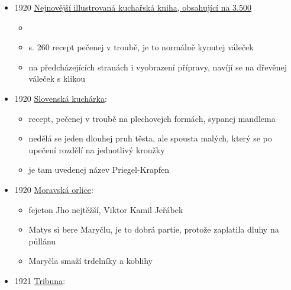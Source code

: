 \begin{itemize}
  \begin{itemize}
  \tightlist
  \item
    roč. 36, č. 40, s. 4
  \item
    není online, 
  \item
    přijela a svůj kraj dobře zná. Posléze zadržáni byli na chvilku ve
    slovácké šenkovně, kdež jim podány slovácké trdláče a
  \end{itemize}
\item
  1920
  \href{https://ndk.cz/uuid/uuid:d08ced10-7b32-11eb-9f97-005056827e51}{Nejnovější
  illustrovaná kuchařská kniha, obsahující na 3.500 }

  \begin{itemize}
  \tightlist
  \item
  \item
    s. 260 recept pečenej v troubě, je to normálně kynutej váleček
  \item
    na předcházejících stranách i vyobrazení přípravy, navíjí se na
    dřevěnej váleček s klikou
  \end{itemize}
\item
  1920
  \href{https://dikda.snk.sk/uuid/uuid:a65dbdb4-70d4-436e-92af-86192f998fc5}{Slovenská
  kuchárka}:

  \begin{itemize}
  \tightlist
  \item
    recept, pečenej v troubě na plechovejch formách, sypanej mandlema
  \item
    nedělá se jeden dlouhej pruh těsta, ale spousta malých, který se po
    upečení rozdělí na jednotlivý kroužky
  \item
    je tam uvedenej název Priegel-Krapfen
  \end{itemize}
\item
  1920
  \href{https://ceskadigitalniknihovna.cz/view/uuid:7a29ece0-be2c-11de-a09c-000d606f5dc6?page=uuid:461eb510-b739-11de-8d2b-000d606f5dc6&fulltext=trdeln\%C3\%AD*&source=mzk}{Moravská
  orlice}:

  \begin{itemize}
  \tightlist
  \item
    fejeton Jho nejtěžší, Viktor Kamil Jeřábek
  \item
    Matys si bere Maryčlu, je to dobrá partie, protože zaplatila dluhy
    na půllánu
  \item
    Maryčla smaží trdelníky a koblihy
  \end{itemize}
\item
  1921
  \href{https://ceskadigitalniknihovna.cz/uuid/uuid:e28419ef-cadc-449a-834c-164adadcc55b}{Tribuna}:


\end{itemize}
